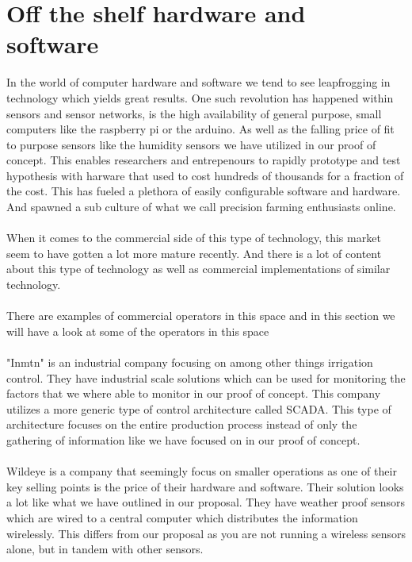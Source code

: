 \documentclass[]{uiophd}
\begin{document}
\section{Off the shelf hardware and software}
In the world of computer hardware and software we tend to see leapfrogging in technology which yields great results. One such revolution has happened within sensors and sensor networks, is the high availability of general purpose, small computers like the raspberry pi or the arduino. As well as the falling price of fit to purpose sensors like the humidity sensors we have utilized in our proof of concept. This enables researchers and entrepenours to rapidly prototype and test hypothesis with harware that used to cost hundreds of thousands for a fraction of the cost. This has fueled a plethora of easily configurable software and hardware. And spawned a sub culture of what we call precision farming enthusiasts online. 
\\\\
When it comes to the commercial side of this type of technology, this market seem to have gotten a lot more mature recently. And there is a lot of content about this type of technology as well as commercial implementations of similar technology.
\\\\
There are examples of commercial operators in this space and in this section we will have a look at some of the operators in this space
\\\\
"Inmtn" is an industrial company focusing on among other things irrigation control. They have industrial scale solutions which can be used for monitoring the factors that we where able to monitor in our proof of concept. This company utilizes a more generic type of control architecture called SCADA. This type of architecture focuses on the entire production process instead of only the gathering of information like we have focused on in our proof of concept.
\\\\
Wildeye is a company that seemingly focus on smaller operations as one of their key selling points is the price of their hardware and software. Their solution looks a lot like what we have outlined in our proposal. They have weather proof sensors which are wired to a central computer which distributes the information wirelessly. This differs from our proposal as you are not running a wireless sensors alone, but in tandem with other sensors. 
\\\\
\end{document}
